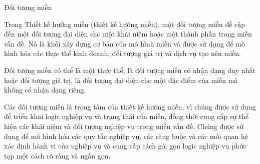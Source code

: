  

 

Đối tượng miền

Trong Thiết kế hướng miền (thiết kế hướng miền), một đối tượng miền đề cập đến một đối tượng đại diện cho một khái niệm hoặc một thành phần trong miền vấn đề. Nó là khối xây dựng cơ bản của mô hình miền và được sử dụng để mô hình hóa các thực thể kinh doanh, đối tượng giá trị và dịch vụ tạo nên miền.

Đối tượng miền có thể là một thực thể, là đối tượng miền có nhận dạng duy nhất hoặc đối tượng giá trị, là đối tượng đại diện cho một đặc điểm của miền mà không có nhận dạng riêng.

Các đối tượng miền là trọng tâm của thiết kế hướng miền, vì chúng được sử dụng để triển khai logic nghiệp vụ và trạng thái của miền, đồng thời cung cấp sự thể hiện các khái niệm và đối tượng nghiệp vụ trong miền vấn đề. Chúng được sử dụng để mô hình hóa các quy tắc nghiệp vụ, các ràng buộc và các mối quan hệ xác định hành vi của nghiệp vụ và cung cấp cách gói gọn logic nghiệp vụ phức tạp một cách rõ ràng và ngắn gọn.
 
